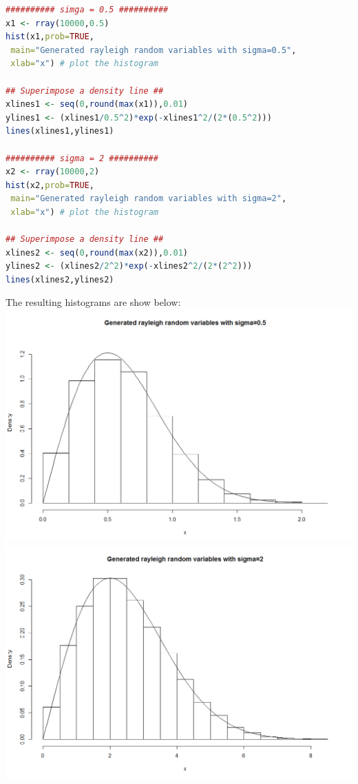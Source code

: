 \documentclass{amsart}
\theoremstyle{definition}
\theoremstyle{remark}
\begin{document}
\begin{enumerate}
\begin{lstlisting}[language=R]
########## simga = 0.5 ##########
x1 <- rray(10000,0.5)
hist(x1,prob=TRUE,
 main="Generated rayleigh random variables with sigma=0.5",
 xlab="x") # plot the histogram

## Superimpose a density line ##
xlines1 <- seq(0,round(max(x1)),0.01)
ylines1 <- (xlines1/0.5^2)*exp(-xlines1^2/(2*(0.5^2)))
lines(xlines1,ylines1)

########## sigma = 2 ##########
x2 <- rray(10000,2)
hist(x2,prob=TRUE,
 main="Generated rayleigh random variables with sigma=2",
 xlab="x") # plot the histogram

## Superimpose a density line ##
xlines2 <- seq(0,round(max(x2)),0.01)
ylines2 <- (xlines2/2^2)*exp(-xlines2^2/(2*(2^2)))
lines(xlines2,ylines2)
\end{lstlisting}
The resulting histograms are show below:\\
\includegraphics[scale=0.6]{rayleigh_0_5}
\includegraphics[scale=0.6]{rayleigh_2}
\end{enumerate}
\end{document}
